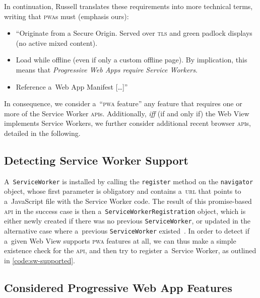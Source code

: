 \documentclass[sigconf]{acmart}
\begin{document}
In continuation, Russell translates these requirements into more technical terms,
writing that \textsc{pwa}s must (emphasis ours):

\begin{itemize}
  \item ``Originate from a Secure Origin.
    Served over \textsc{tls} and green padlock displays (no active mixed content).
  \item Load while offline (even if only a custom offline page).
    By implication, this means that \emph{Progressive Web Apps require Service Workers}.
  \item Reference a~Web App Manifest [\ldots]''
\end{itemize}

In consequence, we consider a~``\textsc{pwa} feature''
any feature that requires  one or more of the Service Worker \textsc{api}s.
Additionally, \emph{iff} (if and only if) the Web View implements Service Workers,
we further consider additional recent browser \textsc{api}s,
detailed in the following.

\subsection{Detecting Service Worker Support}

A~\texttt{ServiceWorker} is installed by calling the \texttt{register} method
on the \texttt{navigator} object, whose first parameter is obligatory
and contains a~\textsc{url} that points to a~JavaScript file with the Service Worker code.
The result of this promise-based \textsc{api} in the success case is then
a~\texttt{ServiceWorkerRegistration} object,
which is either newly created if there was no previous \texttt{ServiceWorker},
or updated in the alternative case
where a~previous \texttt{ServiceWorker} existed~\cite{russell2017serviceworkers}.
In order to detect if a~given Web View supports \textsc{pwa} features at all,
we can thus make a simple existence check for the \textsc{api},
and then try to register a~Service Worker, as outlined in \autoref{code:sw-supported}.

\subsection{Considered Progressive Web App Features}
\end{document}

